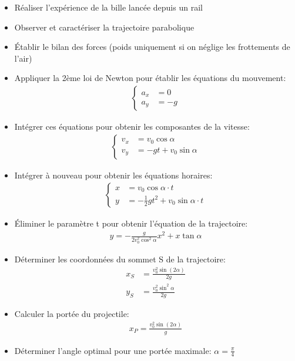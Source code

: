 \documentclass[12pt]{article}
\begin{document}
\begin{itemize}
    \item Réaliser l'expérience de la bille lancée depuis un rail
    \item Observer et caractériser la trajectoire parabolique
    \item Établir le bilan des forces (poids uniquement si on néglige les frottements de l'air)
    \item Appliquer la 2ème loi de Newton pour établir les équations du mouvement:
    \begin{align*}
        \begin{cases}
            a_x &= 0 \\
            a_y &= -g
        \end{cases}
    \end{align*}
    \item Intégrer ces équations pour obtenir les composantes de la vitesse:
    \begin{align*}
        \begin{cases}
            v_x &= v_0\cos\alpha \\
            v_y &= -gt + v_0\sin\alpha
        \end{cases}
    \end{align*}
    \item Intégrer à nouveau pour obtenir les équations horaires:
    \begin{align*}
        \begin{cases}
            x &= v_0\cos\alpha \cdot t \\
            y &= -\frac{1}{2}gt^2 + v_0\sin\alpha \cdot t
        \end{cases}
    \end{align*}
    \item Éliminer le paramètre t pour obtenir l'équation de la trajectoire:
    \begin{align*}
        y = -\frac{g}{2v_0^2\cos^2\alpha}x^2 + x\tan\alpha
    \end{align*}
    \item Déterminer les coordonnées du sommet S de la trajectoire:
    \begin{align*}
        x_S &= \frac{v_0^2\sin(2\alpha)}{2g} \\
        y_S &= \frac{v_0^2\sin^2\alpha}{2g}
    \end{align*}
    \item Calculer la portée du projectile:
    \begin{align*}
        x_P = \frac{v_0^2\sin(2\alpha)}{g}
    \end{align*}
    \item Déterminer l'angle optimal pour une portée maximale: $\alpha = \frac{\pi}{4}$
\end{itemize}
\end{document}
